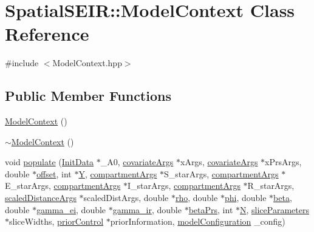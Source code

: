 \hypertarget{classSpatialSEIR_1_1ModelContext}{\section{Spatial\-S\-E\-I\-R\-:\-:Model\-Context Class Reference}
\label{classSpatialSEIR_1_1ModelContext}
}


{\ttfamily \#include $<$Model\-Context.\-hpp$>$}

\subsection*{Public Member Functions}
\begin{DoxyCompactItemize}
\item 
\hyperlink{classSpatialSEIR_1_1ModelContext_aa00f6876aa8bff52856656c0a717af69}{Model\-Context} ()
\item 
\hyperlink{classSpatialSEIR_1_1ModelContext_a8e89f66b29dcd5ad4b9cac2fd18fb30c}{$\sim$\-Model\-Context} ()
\item 
void \hyperlink{classSpatialSEIR_1_1ModelContext_a4dc8841ea3e9b23dd8632a9f4998603d}{populate} (\hyperlink{classSpatialSEIR_1_1InitData}{Init\-Data} $\ast$\-\_\-\-A0, \hyperlink{structSpatialSEIR_1_1covariateArgs}{covariate\-Args} $\ast$x\-Args, \hyperlink{structSpatialSEIR_1_1covariateArgs}{covariate\-Args} $\ast$x\-Prs\-Args, double $\ast$\hyperlink{classSpatialSEIR_1_1ModelContext_aedc2450556dd5cd0b30a0a1100843f81}{offset}, int $\ast$\hyperlink{classSpatialSEIR_1_1ModelContext_a21143ccd9b787ff4a42c83cdb2b81a80}{Y}, \hyperlink{structSpatialSEIR_1_1compartmentArgs}{compartment\-Args} $\ast$S\-\_\-star\-Args, \hyperlink{structSpatialSEIR_1_1compartmentArgs}{compartment\-Args} $\ast$E\-\_\-star\-Args, \hyperlink{structSpatialSEIR_1_1compartmentArgs}{compartment\-Args} $\ast$I\-\_\-star\-Args, \hyperlink{structSpatialSEIR_1_1compartmentArgs}{compartment\-Args} $\ast$R\-\_\-star\-Args, \hyperlink{structSpatialSEIR_1_1scaledDistanceArgs}{scaled\-Distance\-Args} $\ast$scaled\-Dist\-Args, double $\ast$\hyperlink{classSpatialSEIR_1_1ModelContext_a633cc9f969abeeb3ad9d3147023af13f}{rho}, double $\ast$\hyperlink{classSpatialSEIR_1_1ModelContext_a7873aaa6fe424c33d09287e63cdb6787}{phi}, double $\ast$\hyperlink{classSpatialSEIR_1_1ModelContext_a7e15e37b3aa868f1b56d0cf92a9839c8}{beta}, double $\ast$\hyperlink{classSpatialSEIR_1_1ModelContext_a72509958c44ad6153feff07ec3da9895}{gamma\-\_\-ei}, double $\ast$\hyperlink{classSpatialSEIR_1_1ModelContext_a9cbe4ffa8f5b19740f7cffc37d1a7b3c}{gamma\-\_\-ir}, double $\ast$\hyperlink{classSpatialSEIR_1_1ModelContext_abe52e0e1b4ad61cc0a71c104428c7dfc}{beta\-Prs}, int $\ast$\hyperlink{classSpatialSEIR_1_1ModelContext_a170b3ee4076d929c5e8012765f825eed}{N}, \hyperlink{structSpatialSEIR_1_1sliceParameters}{slice\-Parameters} $\ast$slice\-Widths, \hyperlink{structSpatialSEIR_1_1priorControl}{prior\-Control} $\ast$prior\-Information, \hyperlink{structSpatialSEIR_1_1modelConfiguration}{model\-Configuration} \-\_\-config)

\end{DoxyCompactItemize}
